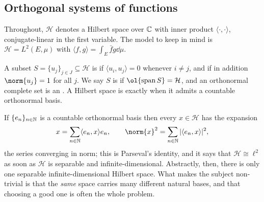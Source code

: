 \documentclass[a4paper]{scrartcl}
\newcommand{\ip}[2]{\langle #1, #2 \rangle}
\newcommand{\spn}{\operatorname{span}}
\newcommand{\Hil}{\mathcal{H}}
\begin{document}
\subsection{Orthogonal systems of functions}

Throughout, $\Hil$ denotes a Hilbert space over $\mathbb{C}$ with inner product $\ip{\cdot}{\cdot}$, conjugate-linear in the first variable. The model to keep in mind is $\Hil = L^2(E,\mu)$ with $\ip{f}{g} = \int_E \bar f g \dd \mu$.

\begin{definition}
	A subset $S = \{u_j\}_{j \in J} \subseteq \Hil$ is  if $\ip{u_i}{u_j} = 0$ whenever $i \ne j$, and  if in addition $\norm{u_j} = 1$ for all $j$. We say $S$ is  if $\ol{\spn S} = \Hil$, and an orthonormal complete set is an . A Hilbert space is  exactly when it admits a countable orthonormal basis.
\end{definition}

If $\{e_n\}_{n \in \mathbb{N}}$ is a countable orthonormal basis then every $x \in \Hil$ has the expansion
$$x = \sum_{n \in \N} \ip{e_n}{x} e_n, \qquad \norm{x}^2 = \sum_{n \in \N} |\ip{e_n}{x}|^2,$$
the series converging in norm; this is Parseval's identity, and it says that $\Hil \cong \ell^2$ as soon as $\Hil$ is separable and infinite-dimensional. Abstractly, then, there is only one separable infinite-dimensional Hilbert space. What makes the subject non-trivial is that the \emph{same} space carries many different natural bases, and that choosing a good one is often the whole problem.
\end{document}
